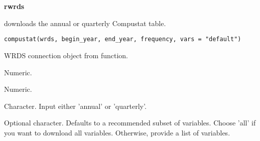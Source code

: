 \documentclass[a4paper]{book}
\begin{document}
\chapter*{}
\begin{center}
{\textbf{\huge rwrds}}
\par\bigskip{\large \today}
\end{center}
\begin{description}
\raggedright{}
\item[Type]
\item[Title]
\item[Version]
\item[Description]
\item[License]
\item[Encoding]
\item[LazyData]
\item[Imports]
\item[RoxygenNote]
\end{description}
%
\begin{Description}\relax
{} downloads the annual or quarterly Compustat table.
\end{Description}
%
\begin{Usage}
\begin{verbatim}
compustat(wrds, begin_year, end_year, frequency, vars = "default")
\end{verbatim}
\end{Usage}
%
\begin{Arguments}
\begin{ldescription}
\item[\code{wrds}] WRDS connection object from  function.

\item[\code{begin\_year}] Numeric.

\item[\code{end\_year}] Numeric.

\item[\code{frequency}] Character. Input either 'annual' or 'quarterly'.

\item[\code{vars}] Optional character. Defaults to a recommended subset of variables. Choose 'all' if
you want to download all variables. Otherwise, provide a list of variables.
\end{ldescription}
\end{Arguments}
\end{document}
